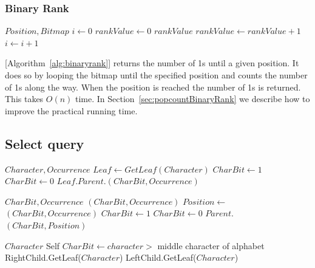 \subsubsection{Binary Rank} 
\label{sec:TheoryBinaryRank}
\begin{algorithm}
\caption{BinaryRank}
\label{alg:binaryrank}
\begin{algorithmic}
 {$Position, Bitmap$}
	\State $i \gets 0$
	\State $rankValue \gets 0$
			\State \Return $rankValue$
		\EndIf
			\State $rankValue \gets rankValue + 1$
		\EndIf
		\State $i \gets i + 1$
	\EndFor
\EndFunction
\end{algorithmic}
\end{algorithm}

 [Algorithm~\ref{alg:binaryrank}] returns the number of 1s until a given position.
It does so by looping the bitmap until the specified position and counts the number of 1s along the way.
When the position is reached the number of 1s is returned.
This takes $O(n)$ time.
In Section~\ref{sec:popcountBinaryRank} we describe how to improve the practical running time.


\subsection{Select query}
\label{sec:selectDescription}
\begin{algorithm}
\caption{Select}
\label{alg:select}
\begin{algorithmic} 
 {$Character, Occurrence$}
\State $Leaf \gets GetLeaf(Character)$
	\State $CharBit \gets 1$
\Else
	\State $CharBit \gets 0$
\EndIf
\State \Return $Leaf.Parent.$$(CharBit, Occurrence)$
\EndFunction

\vspace{1cm}

 {$CharBit, Occurrence$}
	\State \Return {}$(CharBit, Occurrence)$
\EndIf
\State $Position \gets $$(CharBit, Occurrence)$
	\State $CharBit \gets 1$
\Else
	\State $CharBit \gets 0$
\EndIf
\State \Return $Parent.$$(CharBit, Position)$
\EndFunction

\vspace{1cm}

 {$Character$}
	\State \Return Self
\EndIf
\State $CharBit \gets character >$ middle character of alphabet
	\State \Return RightChild.GetLeaf($Character$)
	\State \Return LeftChild.GetLeaf($Character$)
\EndIf
\EndFunction
\end{algorithmic}
\end{algorithm}

